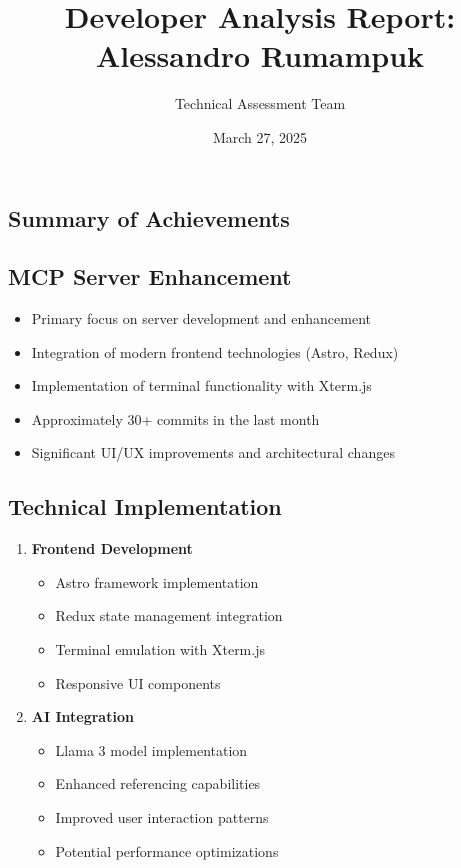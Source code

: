 \documentclass[10pt,a4paper]{article}
\title{\vspace{-1.5cm}\textbf{\large{Developer Analysis Report: Alessandro Rumampuk}}}
\author{\small{Technical Assessment Team}}
\date{\small{March 27, 2025}}
\begin{document}
\maketitle
\vspace{-1.2cm}

\begin{multicols}{2}
\section*{Summary of Achievements}

\subsection*{MCP Server Enhancement}
\begin{itemize}\small
  \item Primary focus on server development and enhancement
  \item Integration of modern frontend technologies (Astro, Redux)
  \item Implementation of terminal functionality with Xterm.js
  \item Approximately 30+ commits in the last month
  \item Significant UI/UX improvements and architectural changes
\end{itemize}

\subsection*{Technical Implementation}
\begin{enumerate}\small
  \item \textbf{Frontend Development}
    \begin{itemize}
      \item Astro framework implementation
      \item Redux state management integration
      \item Terminal emulation with Xterm.js
      \item Responsive UI components
    \end{itemize}
  
  \item \textbf{AI Integration}
    \begin{itemize}
      \item Llama 3 model implementation
      \item Enhanced referencing capabilities
      \item Improved user interaction patterns
      \item Potential performance optimizations
    \end{itemize}
\end{enumerate}


\end{multicols}
\end{document}
